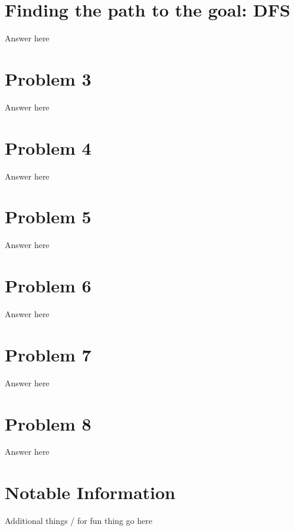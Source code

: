 \documentclass[11pt]{article}
\begin{document}
\section{Finding the path to the goal: DFS}
Answer here
	\pagebreak
\section{Problem 3}
Answer here
	\pagebreak
\section{Problem 4}
Answer here
	\pagebreak
\section{Problem 5}
Answer here
	\pagebreak
\section{Problem 6}
Answer here
	\pagebreak
\section{Problem 7}
Answer here
	\pagebreak
\section{Problem 8}
Answer here
	\pagebreak
\section{Notable Information}
Additional things / for fun thing go here
\end{document}
